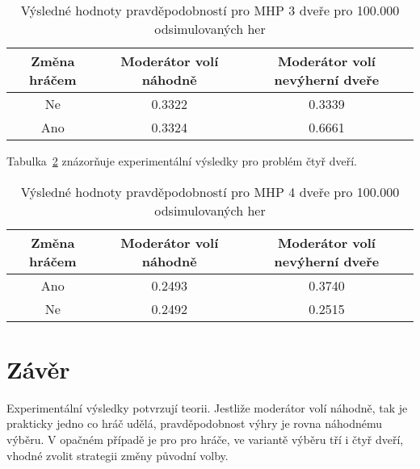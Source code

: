 \begin{table}[htb]
    \centering

    \begin{tabular}{ccc}
        \toprule

        Změna hráčem    & Moderátor volí náhodně    & Moderátor volí nevýherní dveře    \\ \midrule
        Ne              & 0.3322                    & 0.3339                            \\
        Ano             & 0.3324                    & 0.6661                            \\
          
        \bottomrule
    \end{tabular}

    \caption{Výsledné hodnoty pravděpodobností pro MHP 3 dveře pro 100.000 odsimulovaných her}
    \label{table:table1}
\end{table}
\FloatBarrier

Tabulka~\ref{table:table2} znázorňuje experimentální výsledky pro problém čtyř dveří.

\begin{table}[htb]
    \centering

    \begin{tabular}{ccc}
        \toprule

        Změna hráčem    & Moderátor volí náhodně    & Moderátor volí nevýherní dveře    \\ \midrule
        Ano             & 0.2493                    & 0.3740                            \\
        Ne              & 0.2492                    & 0.2515                            \\

        \bottomrule
    \end{tabular}

    \caption{Výsledné hodnoty pravděpodobností pro MHP 4 dveře pro 100.000 odsimulovaných her}
    \label{table:table2}
\end{table}
\FloatBarrier

\section{Závěr}

Experimentální výsledky potvrzují teorii.
Jestliže moderátor volí náhodně, tak je prakticky jedno co hráč udělá, pravděpodobnost výhry je rovna náhodnému výběru.
V opačném případě je pro pro hráče, ve variantě výběru tří i čtyř dveří, vhodné zvolit strategii změny původní volby.
